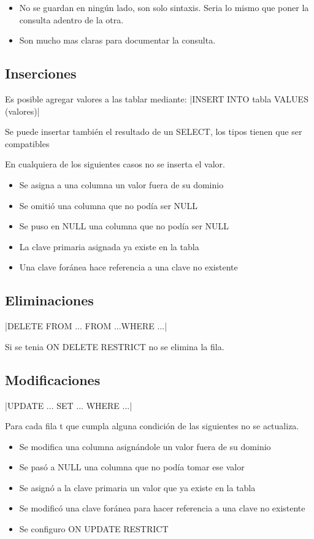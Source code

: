 \begin{itemize}
\item No se guardan en ningún lado, son solo sintaxis. Seria lo mismo que poner la consulta adentro de la otra.
\item Son mucho mas claras para documentar la consulta.
\end{itemize}

\subsection*{Inserciones}

Es posible agregar valores a las tablar mediante:
|INSERT INTO tabla VALUES (valores)|

\medskip
Se puede insertar también el resultado de un SELECT, los tipos tienen que ser compatibles

\medskip
En cualquiera de los siguientes casos no se inserta el valor.
\begin{itemize}
\item Se asigna a una columna un valor fuera de su dominio
\item Se omitió una columna que no podía ser NULL
\item Se puso en NULL una columna que no podía ser NULL
\item La clave primaria asignada ya existe en la tabla
\item Una clave foránea hace referencia a una clave no existente
\end{itemize}


\subsection*{Eliminaciones}

|DELETE FROM ... FROM ...WHERE ...|

Si se tenia ON DELETE RESTRICT no se elimina la fila.

\subsection*{Modificaciones}
|UPDATE ... SET ... WHERE ...|

Para cada fila t que cumpla alguna condición de las siguientes no se actualiza.
\begin{itemize}
\item Se modifica una columna asignándole un valor fuera de su dominio
\item Se pasó a NULL una columna que no podía tomar ese valor
\item Se asignó a la clave primaria un valor que ya existe en la tabla
\item Se modificó una clave foránea para hacer referencia a una clave no existente
\item Se configuro ON UPDATE RESTRICT
\end{itemize}


